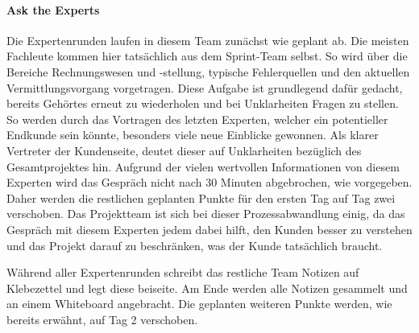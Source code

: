 \paragraph{Ask the Experts}
Die Expertenrunden laufen in diesem Team zunächst wie geplant ab. Die meisten Fachleute kommen hier tatsächlich aus dem Sprint-Team selbst. So wird über die Bereiche Rechnungswesen und -stellung, typische Fehlerquellen und den aktuellen Vermittlungsvorgang vorgetragen. Diese Aufgabe ist grundlegend dafür gedacht, bereits Gehörtes erneut zu wiederholen und bei Unklarheiten Fragen zu stellen. So werden durch das Vortragen des letzten Experten, welcher ein potentieller Endkunde sein könnte, besonders viele neue Einblicke gewonnen. Als klarer Vertreter der Kundenseite, deutet dieser auf Unklarheiten bezüglich des Gesamtprojektes hin. Aufgrund der vielen wertvollen Informationen von diesem Experten wird das Gespräch nicht nach 30 Minuten abgebrochen, wie vorgegeben. Daher werden die restlichen geplanten Punkte für den ersten Tag auf Tag zwei verschoben. Das Projektteam ist sich bei dieser Prozessabwandlung einig, da das Gespräch mit diesem Experten jedem dabei hilft, den Kunden besser zu verstehen und das Projekt darauf zu beschränken, was der Kunde tatsächlich braucht.

Während aller Expertenrunden schreibt das restliche Team Notizen auf Klebezettel und legt diese beiseite. Am Ende werden alle Notizen gesammelt und an einem Whiteboard angebracht. Die geplanten weiteren Punkte werden, wie bereits erwähnt, auf Tag 2 verschoben.
%
%
%
%
%
%

